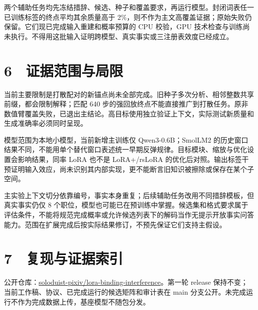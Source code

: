 \documentclass[UTF8,fontset=fandol,10pt,a4paper]{ctexart}
\begin{document}
两个辅助任务均先冻结措辞、候选、种子和覆盖要求，再运行模型。封闭词表任一已训练标签的终点平均其余质量高于 2\%，则不作为主文高覆盖证据；原始失败仍保留。它们现已完成输入重建和概率预算的 CPU 校验，GPU 技术检查与训练尚未执行。不得用这批输入证明跨模型、真实事实或三注册表效度已经成立。



\section*{6　证据范围与局限}
当前主要限制是打散配对的新锚点尚未全部完成。旧种子多次分析、相邻整数共享前缀，都会限制解释；匹配 640 步的强回放终点不能直接推广到打散任务。原非数值臂覆盖失败，已退出主结论。高目标使用独立验证上下文，实际测试新质量和生成准确率必须同时呈现。



模型范围为本地小模型，当前新增主训练仅 Qwen3-0.6B；SmolLM2 的历史窗口结果不同，不能用单个替代窗口表述统一早期反弹规律。目标模块、缩放与优化设置会影响结果，同率 LoRA 也不是 LoRA+/rsLoRA 的优化后对照。输出标签干预证明输入效应，尚未识别其内部实现，更不能断言旧知识被擦除或保存在某个子空间。



主实验上下文切分依靠编号，事实本身重复；后续辅助任务改用不同措辞模板，但真实事实仍仅 8 个职位，模型也可能已在预训练中掌握。候选集和格式要求属于评估条件，不能将规范完成概率或允许候选列表下的解码当作无提示开放事实问答能力。范围在扩展完成后按实际结果修订，不预先保证它们支持主假设。



\section*{7　复现与证据索引}
公开仓库：\href{https://github.com/soloduist-pixiv/lora-binding-interference}{soloduist-pixiv/lora-binding-interference}。第一轮 release 保持不变；当前工作稿、协议、已完成运行的候选矩阵和审计表在 main 分支公开。未完成运行不作为完成数据上传，基座模型不随包分发。
\end{document}
